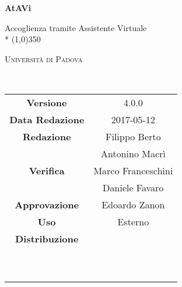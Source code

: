 \documentclass[a4paper,12pt]{article}
\author{}
\date{2017-05-12}
\begin{document}
	\begin{titlepage}
		\centering
		{\huge\bfseries AtAVi\par}
		Accoglienza tramite Assistente Virtuale \\*
		\line(1,0){350} \\
		{\scshape\LARGE Università di Padova \par}
		\vspace{1cm}
		{\scshape\Large \pianodiqualificaRA\ \par}
		\logo
		\newpage
		\begin{tabular}{c|c}
			{\hfill\textbf{Versione}} 			& 4.0.0				\\
			{\hfill\textbf{Data Redazione}} 	& 2017-05-12 		\\
			{\hfill\textbf{Redazione}} 			& Filippo Berto \\ & Antonino Macrì \\
			{\hfill\textbf{Verifica}} 			& Marco Franceschini \\ & Daniele Favaro \\
			{\hfill\textbf{Approvazione}} 		& Edoardo Zanon				\\
			{\hfill\textbf{Uso}} 				& Esterno 					\\
			{\hfill\textbf{Distribuzione}} 		& \vardanega\ \\ & \cardin\ \\ & \prop\ \\
		\end{tabular}
	\end{titlepage}
	
	\pagestyle{myfront}
	\newpage
		
	
	\newpage
		\tableofcontents 	%
	\newpage
		\listoftables 		%
	\newpage
		\listoffigures
	
	\label{LastFrontPage}
	
	\newpage	
	\pagestyle{mymain}
		
	\newpage	
		
	\newpage	
		
	\newpage	
		
		
	\label{LastPage}
\end{document}
